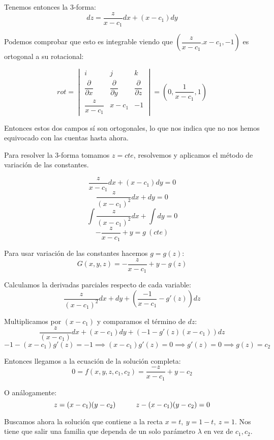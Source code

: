 \documentclass[openany]{book}
\begin{document}
\begin{exercise}
    Tenemos entonces la 3-forma:
    $$ dz = \dfrac{z}{x-c_1}dx + (x-c_1)dy $$

    Podemos comprobar que esto es integrable viendo que $ (\dfrac{z}{x-c_1}.x-c_1,-1) $ es ortogonal a su rotacional:

    $$ rot =  \begin{vmatrix} i & j & k \\ 
    \dfrac{\partial }{\partial x} & \dfrac{\partial }{\partial y} & \dfrac{\partial }{\partial z} \\ 
  \dfrac{z}{x-c_1} &  x-c_1 & -1  \end{vmatrix} = \left(0,\dfrac{1}{x-c_1},1\right) $$

    Entonces estos dos campos sí son ortogonales, lo que nos indica que no nos hemos equivocado con las cuentas hasta ahora.

    Para resolver la 3-forma tomamos $ z = cte $, resolvemos y aplicamos el método de variación de las constantes.

      $$ \dfrac{z}{x-c_1} dx + (x-c_1)dy = 0 $$
      $$ \dfrac{z}{(x-c_1)^2}dx +dy = 0 $$
      $$ \int \dfrac{z}{(x-c_1)^2}dx +\int dy = 0 $$
      $$ -\dfrac{z}{x-c_1} + y = g\ (cte)  $$
      
      Para usar variación de las constantes hacemos $ g = g(z) $:
      $$ G(x,y,z) = -\dfrac{z}{x-c_1} + y - g(z)  $$

      Calculamos la derivadas parciales respecto de cada variable:
      $$ \dfrac{z}{(x-c_1)^2}dx + dy + \left( \dfrac{-1}{x-c_1}-g'(z) \right)dz $$
      
      Multiplicamos por $ (x-c_1) $ y comparamos el término de $ dz $:
      $$ \dfrac{z}{(x-c_1)}dx + (x-c_1)dy + \left( {-1}-g'(z)(x-c_1) \right)dz $$
      $$ -1 -(x-c_1)g'(z) = -1 \implies (x-c_1)g'(z) = 0 \implies g'(z) = 0 \implies g(z) = c_2 $$

      Entonces llegamos a la ecuación de la solución completa:
      $$ 0 = f(x,y,z,c_1,c_2) = \dfrac{-z}{x-c_1} + y -c_2  $$

      O análogamente:
      $$ z = (x-c_1)(y-c_2)\hspace{10mm} z-(x-c_1)(y-c_2) = 0 $$

      Buscamos ahora la solución que contiene a la recta $ x = t,\ y = 1-t,\ z = 1 $. Nos tiene que salir una familia que dependa de un solo parámetro $ \lambda $ en vez de $ c_1,c_2 $.
      

\end{exercise}
\end{document}
